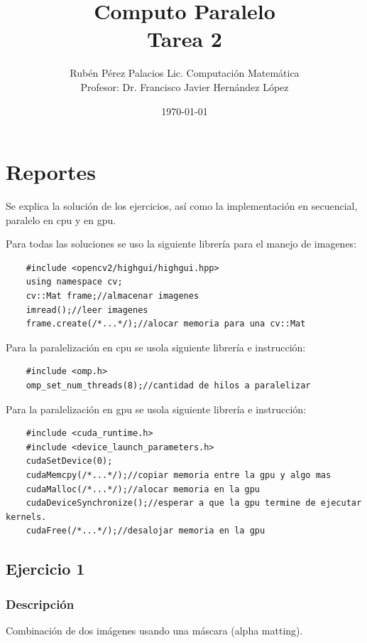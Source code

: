 \documentclass[letterpaper]{article}
\title{Computo Paralelo \\ Tarea 2}
\author{Rubén Pérez Palacios Lic. Computación Matemática\\Profesor: Dr. Francisco Javier Hernández López}
\date{\today}
\theoremstyle{definition}
\theoremstyle{lemathm}
\theoremstyle{lemathm}
\theoremstyle{lemathm}
\theoremstyle{lemademthm}
\newcommand{\1}{\mathbbm{1}}
\begin{document}
	\maketitle

	\section*{Reportes}

	Se explica la solución de los ejercicios, así como la implementación en secuencial, paralelo en cpu y en gpu.

	Para todas las soluciones se uso la siguiente librería para el manejo de imagenes:

	\begin{verbatim}
	#include <opencv2/highgui/highgui.hpp>
	using namespace cv;
	cv::Mat frame;//almacenar imagenes
	imread();//leer imagenes
	frame.create(/*...*/);//alocar memoria para una cv::Mat
	\end{verbatim}

	Para la paralelización en cpu se usola siguiente librería e instrucción:

	\begin{verbatim}
	#include <omp.h>
	omp_set_num_threads(8);//cantidad de hilos a paralelizar
	\end{verbatim}

	Para la paralelización en gpu se usola siguiente librería e instrucción:

	\begin{verbatim}
	#include <cuda_runtime.h>
	#include <device_launch_parameters.h>
	cudaSetDevice(0);
	cudaMemcpy(/*...*/);//copiar memoria entre la gpu y algo mas
	cudaMalloc(/*...*/);//alocar memoria en la gpu 
	cudaDeviceSynchronize();//esperar a que la gpu termine de ejecutar kernels.
	cudaFree(/*...*/);//desalojar memoria en la gpu
	\end{verbatim}

	\newpage

	\subsection*{Ejercicio 1}

	\subsubsection*{Descripción}

	Combinación de dos imágenes usando una máscara (alpha matting).
\end{document}

